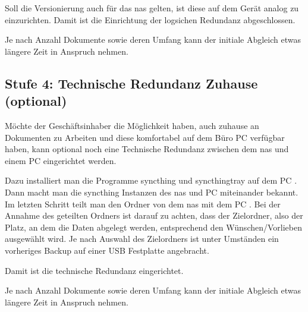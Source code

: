
Soll die Versionierung auch für das \gls{nas}  gelten,
ist diese auf dem Gerät analog zu 
einzurichten. Damit ist die Einrichtung der logsichen Redundanz abgeschlossen.
\bigskip

 Je nach Anzahl Dokumente sowie deren Umfang kann der
initiale Abgleich etwas längere Zeit in Anspruch nehmen.

\subsection{Stufe 4: Technische Redundanz Zuhause (optional)}

Möchte der Geschäftsinhaber die Möglichkeit haben, auch zuhause an Dokumenten
zu Arbeiten und diese komfortabel auf dem Büro PC verfügbar haben, kann optional
noch eine Technische Redundanz zwischen dem \gls{nas} 
und einem PC  eingerichtet werden.
\bigskip

Dazu installiert man die Programme \gls{syncthing} und \gls{syncthingtray}
auf dem PC . Dann macht man die \gls{syncthing} Instanzen
des \gls{nas}  und PC  miteinander
bekannt. Im letzten Schritt teilt man den Ordner von dem \gls{nas}
 mit dem PC . Bei der Annahme des
geteilten Ordners ist darauf zu achten, dass der Zielordner, also der Platz,
an dem die Daten abgelegt werden, entsprechend den Wünschen/Vorlieben ausgewählt
wird.  Je nach Auswahl des Zielordners ist unter Umständen
ein vorheriges Backup auf einer USB Festplatte angebracht.


Damit ist die technische Redundanz  eingerichtet.
\bigskip

 Je nach Anzahl Dokumente sowie deren Umfang kann der
initiale Abgleich etwas längere Zeit in Anspruch nehmen.
